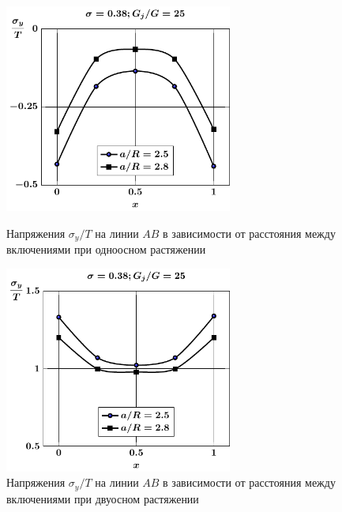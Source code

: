 \begin{figure}[h!]
\centering\footnotesize
\parbox[b]{7.5cm}{\centering\includegraphics[width=7.5cm]{periodic-spheres-inc27-a-g25-t1-sig_y.pdf}
\caption{Напряжения $\sigma_y/T$ на линии $AB$ в зависимости от расстояния между включениями при одноосном растяжении
\label{f:11:14}}}\hfil\hfil
\parbox[b]{7.5cm}{\centering\includegraphics[width=7.5cm]{periodic-spheres-inc27-a-g25-t2-sig_y.pdf}
\caption{Напряжения $\sigma_y/T$ на линии $AB$ в зависимости от расстояния между включениями при двуосном растяжении
\label{f:11:15}}}
\end{figure}

